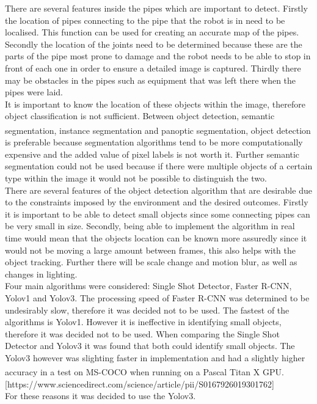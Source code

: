 \documentclass[11pt]{article}		%
\newcommand{\supercite}[1]{\textsuperscript{\cite{#1}}}		%
\begin{document}
			There are several features inside the pipes which are important to detect. 
			Firstly the location of pipes connecting to the pipe that the robot is in need to be localised. This function can be used for creating an accurate map of the pipes.
			Secondly the location of the joints need to be determined because these are the parts of the pipe most prone to damage and the robot needs to be able to stop in front of each one in order to ensure a detailed image is captured. 
			Thirdly there may be obstacles in the pipes such as equipment that was left there when the pipes were laid.
			\\
	        It is important to know the location of these objects within the image, therefore object classification is not sufficient. 
	        Between object detection, semantic segmentation, instance segmentation and panoptic segmentation\supercite{segmentation}, object detection is preferable because segmentation algorithms tend to be more computationally expensive and the added value of pixel labels is not worth it. 
	        Further semantic segmentation could not be used because if there were multiple objects of a certain type within the image it would not be possible to distinguish the two.
	        \\
	        There are several features of the object detection algorithm that are desirable due to the constraints imposed by the environment and the desired outcomes. 
	        Firstly it is important to be able to detect small objects since some connecting pipes can be very small in size. 
	        Secondly, being able to implement the algorithm in real time would mean that the objects location can be known more assuredly since it would not be moving a large amount between frames, this also helps with the object tracking. 
	        Further there will be scale change and motion blur, as well as changes in lighting.
	        \\
	        Four main algorithms were considered: Single Shot Detector, Faster R-CNN, Yolov1 and Yolov3. 
	        The processing speed of Faster R-CNN was determined to be undesirably slow, therefore it was decided not to be used. 
	        The fastest of the algorithms is Yolov1. However it is ineffective in identifying small objects, therefore it was decided not to be used. 
	        When comparing the Single Shot Detector and Yolov3 it was found that both could identify small objects. 
	        The Yolov3 however was slighting faster in implementation and had a slightly higher accuracy in a test on MS-COCO when running on a Pascal Titan X GPU.\supercite{YOLO}[https://www.sciencedirect.com/science/article/pii/S0167926019301762]
	        \\
	        For these reasons it was decided to use the Yolov3.
	        
\end{document}

